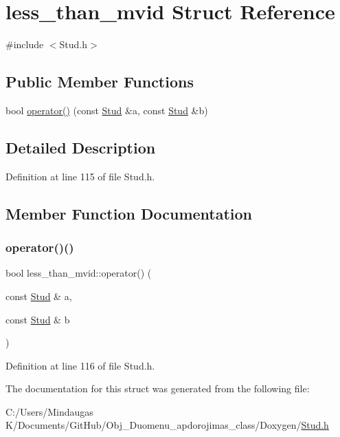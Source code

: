 \hypertarget{structless__than__mvid}{}\section{less\+\_\+than\+\_\+mvid Struct Reference}
\label{structless__than__mvid}


{\ttfamily \#include $<$Stud.\+h$>$}

\subsection*{Public Member Functions}
\begin{DoxyCompactItemize}
\item 
bool \mbox{\hyperlink{structless__than__mvid_a87c29141d7da17106b448f9000d3a342}{operator()}} (const \mbox{\hyperlink{class_stud}{Stud}} \&a, const \mbox{\hyperlink{class_stud}{Stud}} \&b)
\end{DoxyCompactItemize}


\subsection{Detailed Description}


Definition at line 115 of file Stud.\+h.



\subsection{Member Function Documentation}
\mbox{\label{structless__than__mvid_a87c29141d7da17106b448f9000d3a342}} 
\subsubsection{\texorpdfstring{operator()()}{operator()()}}
{\footnotesize\ttfamily bool less\+\_\+than\+\_\+mvid\+::operator() (\begin{DoxyParamCaption}\item[{const \mbox{\hyperlink{class_stud}{Stud}} \&}]{a,  }\item[{const \mbox{\hyperlink{class_stud}{Stud}} \&}]{b }\end{DoxyParamCaption})\hspace{0.3cm}{\ttfamily [inline]}}



Definition at line 116 of file Stud.\+h.



The documentation for this struct was generated from the following file\+:\begin{DoxyCompactItemize}
\item 
C\+:/\+Users/\+Mindaugas K/\+Documents/\+Git\+Hub/\+Obj\+\_\+\+Duomenu\+\_\+apdorojimas\+\_\+class/\+Doxygen/\mbox{\hyperlink{_stud_8h}{Stud.\+h}}\end{DoxyCompactItemize}
